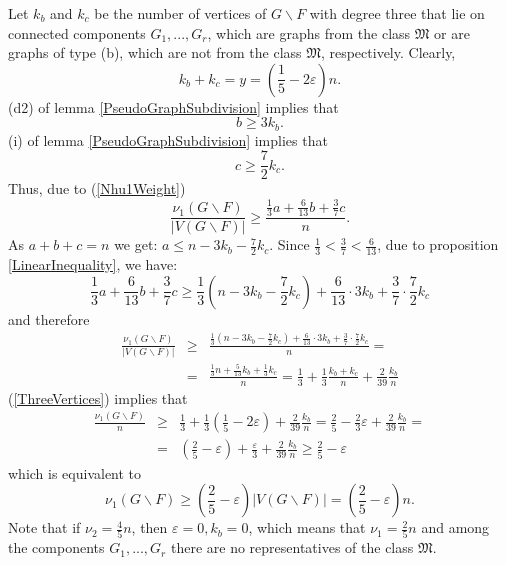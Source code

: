 \documentclass[fleqn,12pt,twoside]{article}
\newenvironment{proof}[1][Proof.]{\begin{trivlist}
\item[\hskip \labelsep {\bfseries #1}]}{\end{trivlist}}
\begin{document}
\begin{proof}
Let $k_{b}$ and $k_{c}$ be the number of vertices of $G\backslash F$
with degree three that lie on connected components
$G_{1},...,G_{r}$, which are graphs from the class $\mathfrak{M}$ or
are graphs of type (b), which are not from the class $\mathfrak{M}$,
respectively. Clearly,
\begin{equation}
k_{b}+k_{c}=y=(\frac{1}{5}-2\varepsilon )n. \label{ThreeVertices}
\end{equation}(d2) of lemma \ref{PseudoGraphSubdivision} implies that\begin{equation*}
b\geq 3k_{b}\text{.}
\end{equation*}(i) of lemma \ref{PseudoGraphSubdivision} implies that
\begin{equation*}
c\geq \frac{7}{2}k_{c}\text{.}
\end{equation*}Thus, due to (\ref{Nhu1Weight})\begin{equation*}
\frac{\nu _{1}(G\backslash F)}{\left\vert V(G\backslash
F)\right\vert }\geq
\frac{\frac{1}{3}a+\frac{6}{13}b+\frac{3}{7}c}{n}\text{.}
\end{equation*}As $a+b+c=n$ we get: $a\leq n -3k_{b}-\frac{7}{2}k_{c}$. Since $\frac{1}{3}<\frac{3}{7}<\frac{6}{13}$, due to proposition \ref{LinearInequality}, we have:\begin{equation*}
\frac{1}{3}a+\frac{6}{13}b+\frac{3}{7}c\geq \frac{1}{3}(n-3k_{b}-\frac{7}{2}k_{c})+\frac{6}{13}\cdot 3k_{b}+\frac{3}{7}\cdot \frac{7}{2}k_{c}
\end{equation*}and therefore\begin{eqnarray*}
\frac{\nu _{1}(G\backslash F)}{\left\vert V(G\backslash
F)\right\vert }
&\geq &\frac{\frac{1}{3}(n -3k_{b}-\frac{7}{2}k_{c})+\frac{6}{13}\cdot 3k_{b}+\frac{3}{7}\cdot \frac{7}{2}k_{c}}{n }= \\
&=&\frac{\frac{1}{3}n +\frac{5}{13}k_{b}+\frac{1}{3}k_{c}}{n }=\frac{1}{3}+\frac{1}{3}\frac{k_{b}+k_{c}}{n }+\frac{2}{39}\frac{k_{b}}{n }
\end{eqnarray*}(\ref{ThreeVertices}) implies that
\begin{eqnarray*}
\frac{\nu _{1}(G\backslash F)}{n }
&\geq &\frac{1}{3}+\frac{1}{3}(\frac{1}{5}-2\varepsilon )+\frac{2}{39}\frac{k_{b}}{n }=\frac{2}{5}-\frac{2}{3}\varepsilon +\frac{2}{39}\frac{k_{b}}{n }= \\
&=&(\frac{2}{5}-\varepsilon )+\frac{\varepsilon }{3}+\frac{2}{39}\frac{k_{b}}{n}\geq \frac{2}{5}-\varepsilon
\end{eqnarray*}which is equivalent to\begin{equation*}
\nu _{1}(G\backslash F)\geq (\frac{2}{5}-\varepsilon )\left\vert
V(G\backslash F)\right\vert =(\frac{2}{5}-\varepsilon )n.
\end{equation*}Note that if $\nu _{2}=\frac{4}{5}n$, then
$\varepsilon =0,k_{b}=0$, which means that $\nu _{1}=\frac{2}{5}n$ and among the components $G_{1},...,G_{r}$ there are no
representatives of the class $\mathfrak{M}$.


\end{proof}
\end{document}
